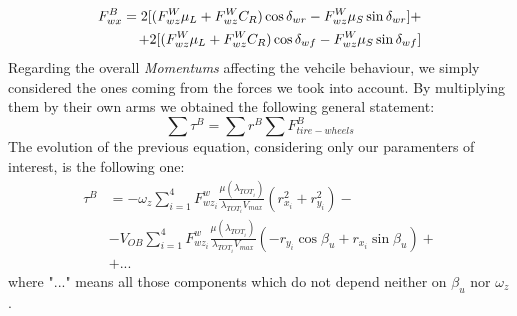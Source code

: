 \documentclass[a4paper,12pt,titlepage]{report}
\begin{document}
			\begin{equation} \label{F_{wx}}
			\begin{split}
				F_{wx}^{B} = 2 [(F_{wz}^{W} \mu_{L} + F_{wz}^{W} C_{R})\cos\delta_{wr} - F_{wz}^{W} \mu_{S}\sin\delta_{wr}] + \\ + 2 [(F_{wz}^{W} \mu_{L} + F_{wz}^{W} C_{R})\cos\delta_{wf} - F_{wz}^{W} \mu_{S}\sin\delta_{wf}] 
			\end{split}
			\end{equation}
		Regarding the overall \textit{Momentums} affecting the vehcile behaviour, we simply considered the ones coming from the forces we took into account. By multiplying them by their own arms we obtained the following general statement:
			\begin{equation}
				\sum \tau^{B} = \sum r^{B} \sum F_{tire-wheels}^{B}
			\end{equation}
		The evolution of the previous equation, considering only our paramenters of interest, is the following one:  
			\begin{equation}
				\begin{split}
					\tau^{B} &= -\omega_{z}\sum_{i=1}^{4} F_{wz_{i}}^{w} \frac{\mu(\lambda_{TOT_{i}})}{\lambda_{TOT_{i}} V_{max}} (r_{x_{i}}^{2} + r_{y_{i}}^{2})- \\ &- V_{OB}\sum_{i=1}^{4} F_{wz_{i}}^{w} \frac{\mu(\lambda_{TOT_{i}})}{\lambda_{TOT_{i}} V_{max}} (- r_{y_{i}} \cos \beta_{u} + r_{x_{i}} \sin\beta_{u})+ \\ &+ ... 
				\end{split}	
			\end{equation}
		where "$ ... $" means all those components which do not depend neither on $\beta_{u}$ nor $\omega_{z}$.
\end{document}
